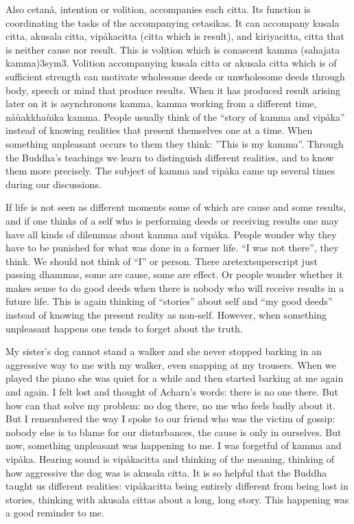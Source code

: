 \documentclass[10pt,a4paper,final]{article}
\begin{document}
Also cetanå, intention or volition,
accompanies each citta. Its function is coordinating the tasks of the
accompanying cetasikas. It can accompany kusala citta, akusala citta,
vipåkacitta (citta which is
result), and kiriyacitta, citta that is neither
cause nor result. This is volition which is conascent kamma (sahajata
kamma)\protect\hyperlinksdfootnote3sym3. Volition
accompanying kusala citta or akusala citta which is of sufficient
strength can motivate wholesome deeds or unwholesome deeds through body,
speech or mind that produce results. When it has produced result arising
later on it is asynchronous kamma, kamma working from a different time,
nåùakkhaùika kamma. People
usually think of the ``story of kamma and vipåka'' instead of knowing
realities that present themselves one at a time. When something
unpleasant occurs to them they think: ''This is my kamma''. Through the
Buddha's teachings we learn to distinguish different realities, and to
know them more precisely. The subject of kamma and vipåka came up
several times during our discussions. 

If life is not seen as different moments
some of which are cause and some results, and if one thinks of a self
who is performing deeds or receiving results one may have all kinds of
dilemmas about kamma and vipåka. People wonder why they have to be
punished for what was done in a former life.
``I was not
there'', they think.
We should not think of
``I'' or person. There aretextsuperscript
just passing dhammas, some are cause,
some are effect. Or people wonder whether it makes sense to
do good deeds when there is nobody who will receive results in a future
life. This is again thinking of ``stories'' about self and ``my good
deeds'' instead of knowing the present reality as non-self. However,
when something unpleasant happens one tends to forget about the truth.


My
sister's dog cannot stand a walker and
she never stopped barking in an aggressive way to me with my
walker, even snapping at my trousers.
When we played the piano she was quiet for a while and then started
barking at me again and again. I felt lost and thought of
Acharn's words: there is no one there.
But how can that solve my problem: no dog there, no me who feels badly
about it. But I remembered the way I spoke to our friend who was the
victim of gossip: nobody else is to blame for our disturbances, the
cause is only in ourselves. But now, something unpleasant was happening
to me. I was forgetful of kamma and
vipåka. Hearing sound is
vipåkacitta and thinking of
the meaning, thinking of how aggressive the dog was is akusala citta. It
is so helpful that the Buddha taught us different realities:
vipåkacitta being entirely
different from being lost in stories, thinking with akusala cittas about
a long, long story. This happening was a good reminder to me. 
\end{document}
